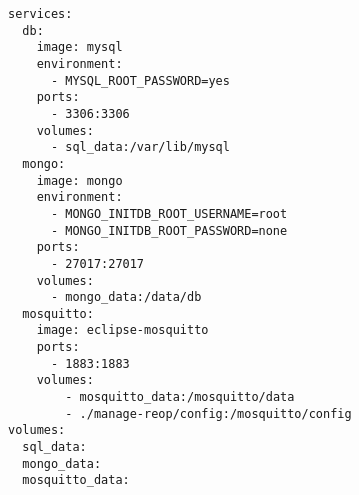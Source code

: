 
\begin{lstlisting}[language=docker-compose-2,caption={Auxiliary Services \code{docker-compose.yml}},breaklines=true,label={code::compose_helper}]
services:
  db:
    image: mysql
    environment:
      - MYSQL_ROOT_PASSWORD=yes
    ports:
      - 3306:3306
    volumes:
      - sql_data:/var/lib/mysql
  mongo:
    image: mongo
    environment:
      - MONGO_INITDB_ROOT_USERNAME=root
      - MONGO_INITDB_ROOT_PASSWORD=none
    ports:
      - 27017:27017
    volumes:
      - mongo_data:/data/db
  mosquitto:
    image: eclipse-mosquitto
    ports:
      - 1883:1883
    volumes:
        - mosquitto_data:/mosquitto/data
        - ./manage-reop/config:/mosquitto/config
volumes:
  sql_data:
  mongo_data:
  mosquitto_data:
\end{lstlisting}
